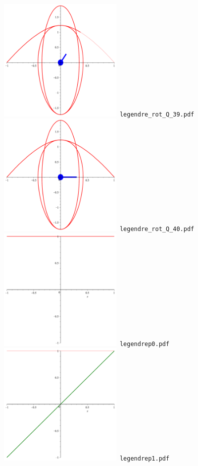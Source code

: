 \documentclass[a4paper]{amsart}
\begin{document}
\includegraphics[width=6cm]{legendre_rot_Q_39.pdf}\verb+ legendre_rot_Q_39.pdf+\\
\includegraphics[width=6cm]{legendre_rot_Q_40.pdf}\verb+ legendre_rot_Q_40.pdf+\\
\includegraphics[width=6cm]{legendrep0.pdf}\verb+ legendrep0.pdf+\\
\includegraphics[width=6cm]{legendrep1.pdf}\verb+ legendrep1.pdf+\\
\end{document}
